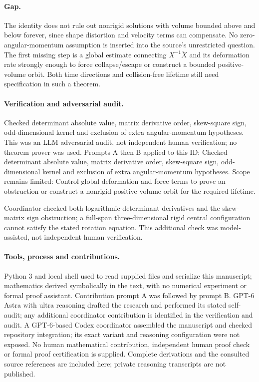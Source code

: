 \documentclass[11pt]{article}
\begin{document}
\paragraph{Gap.}The identity does not rule out nonrigid solutions with volume bounded above and below forever, since shape distortion and velocity terms can compensate. No zero-angular-momentum assumption is inserted into the source's unrestricted question. The first missing step is a global estimate connecting \(X^{-1}\ddot X\) and its deformation rate strongly enough to force collapse/escape or construct a bounded positive-volume orbit. Both time directions and collision-free lifetime still need specification in such a theorem.

\paragraph{Verification and adversarial audit.}
Checked determinant absolute value, matrix derivative order, skew-square sign, odd-dimensional kernel and exclusion of extra angular-momentum hypotheses. This was an LLM adversarial audit, not independent human verification; no theorem prover was used. Prompts A then B applied to this ID: Checked determinant absolute value, matrix derivative order, skew-square sign, odd-dimensional kernel and exclusion of extra angular-momentum hypotheses. Scope remains limited: Control global deformation and force terms to prove an obstruction or construct a nonrigid positive-volume orbit for the required lifetime.

Coordinator checked both logarithmic-determinant derivatives and the skew-matrix sign obstruction; a full-span three-dimensional rigid central configuration cannot satisfy the stated rotation equation. This additional check was model-assisted, not independent human verification.

\paragraph{Tools, process and contributions.}
Python 3 and local shell used to read supplied files and serialize this manuscript; mathematics derived symbolically in the text, with no numerical experiment or formal proof assistant. Contribution prompt A was followed by prompt B. GPT-6 Astra with ultra reasoning drafted the research and performed its stated self-audit; any additional coordinator contribution is identified in the verification and audit. A GPT-6-based Codex coordinator assembled the manuscript and checked repository integration; its exact variant and reasoning configuration were not exposed. No human mathematical contribution, independent human proof check or formal proof certification is supplied. Complete derivations and the consulted source references are included here; private reasoning transcripts are not published.
\end{document}
